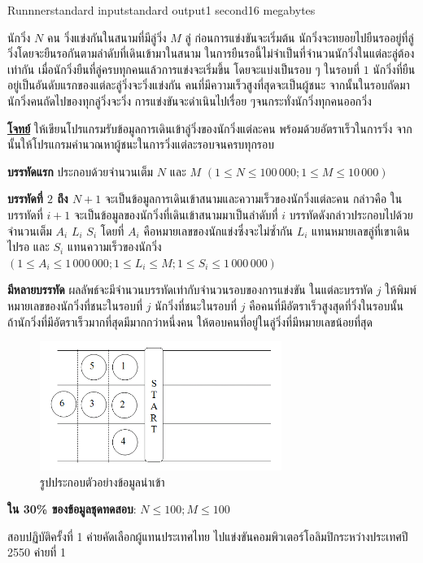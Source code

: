 \documentclass[11pt,a4paper]{article}
\begin{document}
\begin{problem}{Runnner}{standard input}{standard output}{1 second}{16 megabytes}

นักวิ่ง $N$ คน วิ่งแข่งกันในสนามที่มีลู่วิ่ง $M$ ลู่ ก่อนการแข่งขันจะเริ่มต้น นักวิ่งจะทยอยไปยืนรออยู่ที่ลู่วิ่งโดยจะยืนรอกันตามลำดับที่เดินเข้ามาในสนาม  ในการยืนรอนี้ไม่จำเป็นที่จำนวนนักวิ่งในแต่ละลู่ต้องเท่ากัน  เมื่อนักวิ่งยืนที่ลู่ครบทุกคนแล้วการแข่งจะเริ่มขึ้น  โดยจะแบ่งเป็นรอบ ๆ ในรอบที่ $1$ นักวิ่งที่ยืนอยู่เป็นอันดับแรกของแต่ละลู่วิ่งจะวิ่งแข่งกัน คนที่มีความเร็วสูงที่สุดจะเป็นผู้ชนะ จากนั้นในรอบถัดมานักวิ่งคนถัดไปของทุกลู่วิ่งจะวิ่ง  การแข่งขันจะดำเนินไปเรื่อย  ๆจนกระทั่งนักวิ่งทุกคนออกวิ่ง

\bigskip
\underline{\textbf{โจทย์}}  ให้เขียนโปรแกรมรับข้อมูลการเดินเข้าลู่วิ่งของนักวิ่งแต่ละคน พร้อมด้วยอัตราเร็วในการวิ่ง  จากนั้นให้โปรแกรมคำนวณหาผู้ชนะในการวิ่งแต่ละรอบจนครบทุกรอบ

\InputFile

\textbf{บรรทัดแรก} ประกอบด้วยจำนวนเต็ม $N$ และ $M$  $(1 \leq N \leq 100\,000; 1 \leq M \leq 10\,000)$

\textbf{บรรทัดที่ $2$ ถึง $N+1$} จะเป็นข้อมูลการเดินเข้าสนามและความเร็วของนักวิ่งแต่ละคน กล่าวคือ ในบรรทัดที่ $i+1$  จะเป็นข้อมูลของนักวิ่งที่เดินเข้าสนามมาเป็นลำดับที่ $i$ บรรทัดดังกล่าวประกอบไปด้วยจำนวนเต็ม $A_i$ $L_i$ $S_i$  โดยที่ $A_i$ คือหมายเลขของนักแข่งซึ่งจะไม่ซ้ำกัน  $L_i$ แทนหมายเลขลู่ที่เขาเดินไปรอ และ $S_i$ แทนความเร็วของนักวิ่ง  $(1 \leq A_i \leq 1\,000\,000; 1\leq L_i \leq M; 1\leq S_i \leq 1\,000\,000)$

\OutputFile

\textbf{มีหลายบรรทัด} ผลลัพธ์จะมีจำนวนบรรทัดเท่ากับจำนวนรอบของการแข่งขัน ในแต่ละบรรทัด $j$ ให้พิมพ์หมายเลขของนักวิ่งที่ชนะในรอบที่ $j$  นักวิ่งที่ชนะในรอบที่ $j$ คือคนที่มีอัตราเร็วสูงสุดที่วิ่งในรอบนั้น  ถ้านักวิ่งที่มีอัตราเร็วมากที่สุดมีมากกว่าหนึ่งคน ให้ตอบคนที่อยู่ในลู่วิ่งที่มีหมายเลขน้อยที่สุด

\Examples

\begin{example}
%
\end{example}

\Note

\begin{figure}[h]
\centering
\includegraphics[width=0.7\textwidth]{../latex/img/1049/1049-1.png}
\caption{รูปประกอบตัวอย่างข้อมูลนำเข้า}
\end{figure}

\Scoring

\textbf{ใน 30\% ของข้อมูลชุดทดสอบ}: $N \leq 100; M\leq 100$

\Source

สอบปฏิบัติครั้งที่ 1 ค่ายคัดเลือกผู้แทนประเทศไทย ไปแข่งขันคอมพิวเตอร์โอลิมปิกระหว่างประเทศปี 2550 ค่ายที่ 1

\end{problem}
\end{document}
